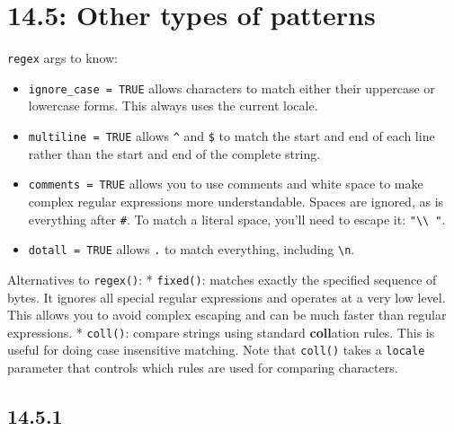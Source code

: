 \documentclass[]{book}
\providecommand{\tightlist}{%
  \setlength{\itemsep}{0pt}\setlength{\parskip}{0pt}}
\theoremstyle{definition}
\theoremstyle{definition}
\theoremstyle{definition}
\theoremstyle{remark}
\begin{document}
\hypertarget{other-types-of-patterns}{%
\section{14.5: Other types of patterns}\label{other-types-of-patterns}}

\texttt{regex} args to know:

\begin{itemize}
\tightlist
\item
  \texttt{ignore\_case\ =\ TRUE} allows characters to match either their
  uppercase or lowercase forms. This always uses the current locale.
\item
  \texttt{multiline\ =\ TRUE} allows \texttt{\^{}} and \texttt{\$} to
  match the start and end of each line rather than the start and end of
  the complete string.
\item
  \texttt{comments\ =\ TRUE} allows you to use comments and white space
  to make complex regular expressions more understandable. Spaces are
  ignored, as is everything after \texttt{\#}. To match a literal space,
  you'll need to escape it:
  \texttt{"\textbackslash{}\textbackslash{}\ "}.
\item
  \texttt{dotall\ =\ TRUE} allows \texttt{.} to match everything,
  including \texttt{\textbackslash{}n}.
\end{itemize}

Alternatives to \texttt{regex()}: * \texttt{fixed()}: matches exactly
the specified sequence of bytes. It ignores all special regular
expressions and operates at a very low level. This allows you to avoid
complex escaping and can be much faster than regular expressions. *
\texttt{coll()}: compare strings using standard \textbf{coll}ation
rules. This is useful for doing case insensitive matching. Note that
\texttt{coll()} takes a \texttt{locale} parameter that controls which
rules are used for comparing characters.

\hypertarget{section-51}{%
\subsection{14.5.1}\label{section-51}}
\end{document}
